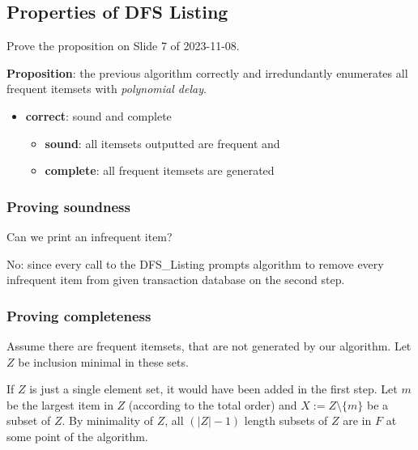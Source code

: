 \documentclass{article}
\begin{document}

  \subsection{Properties of DFS Listing}
  \begin{centerframebox}
    Prove the proposition on Slide 7 of 2023-11-08.

    \textbf{Proposition}: the previous algorithm correctly and irredundantly enumerates all
    frequent itemsets with \textit{polynomial delay}.
    \begin{itemize}
      \item \textbf{correct}: sound and complete
      \begin{itemize}
        \item \textbf{sound}: all itemsets outputted are frequent and
        \item \textbf{complete}: all frequent itemsets are generated
      \end{itemize}
    \end{itemize}
  \end{centerframebox}
  \subsubsection*{Proving soundness}
  Can we print an infrequent item?

  No: since every call to the DFS\_Listing prompts algorithm to remove every infrequent item from given transaction database on the second step.

  \subsubsection*{Proving completeness}
  Assume there are frequent itemsets, that are not generated by our algorithm.
  Let $Z$ be inclusion minimal in these sets.

  If $Z$ is just a single element set, it would have been added in the first step.
  Let $m$ be the largest item in $Z$ (according to the total order) and $X := Z \setminus \{m\}$ be a subset of $Z$.
  By minimality of $Z$, all $(|Z| - 1)$ length subsets of $Z$ are in $F$ at some point of the algorithm.
\end{document}
